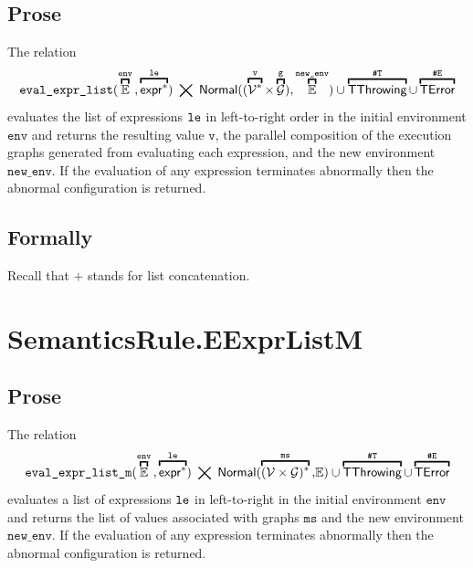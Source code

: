 \documentclass{book}
\newcommand\eqname[0]{\stackrel{\mathsmaller{\mathsf{is}}}{=}}
\newcommand\eqdef[0]{:=}
\newcommand\overname[2]{\overbracket{#1}^{#2}}
\newcommand\xgraph[0]{\textsf{g}}
\newcommand\emptygraph[0]{{\emptyset}_\xgraph}
\newcommand\XGraphs[0]{\mathcal{G}}
\newcommand\vals[0]{\mathcal{V}}
\newcommand\evalarrow[0]{\stackrel{\mathsf{asl}}{\rightsquigarrow}}
\newcommand\aslrel[0]{\bigtimes}
\newcommand\aslsep[0]{\mathbf{,}}
\newcommand\sslash[0]{\mathbin{/\mkern-6mu/}}
\newcommand\terminateas[0]{\;\sslash\;}
\newcommand\ThrowingConfig[0]{\texttt{\#T}}
\newcommand\ErrorConfig[0]{\texttt{\#E}}
\newcommand\OrAbnormal[0]{\terminateas \ThrowingConfig, \ErrorConfig}
\newcommand\TError[0]{\textsf{TError}}
\newcommand\TThrowing[0]{\textsf{TThrowing}}
\newcommand\evalexpr[1]{\texttt{eval\_expr}(#1)}
\newcommand\evalexprlist[1]{\texttt{eval\_expr\_list}(#1)}
\newcommand\evalexprlistm[1]{\texttt{eval\_expr\_list\_m}(#1)}
\newcommand\Normal[0]{\textsf{Normal}}
\newcommand\newenv[0]{\texttt{new\_env}}
\newcommand\env[0]{\texttt{env}}
\newcommand\envone[0]{\texttt{env1}}
\newcommand\vg[0]{\texttt{g}}
\newcommand\vv[0]{\texttt{v}}
\newcommand\vvs[0]{\texttt{vs}}
\newcommand\vms[0]{\texttt{ms}}
\newcommand\vvone[0]{\texttt{v1}}
\newcommand\vgone[0]{\texttt{g1}}
\newcommand\vgtwo[0]{\texttt{g2}}
\begin{document}
\subsection{Prose}
The relation
\[
  \evalexprlist{\overname{\envs}{\env} \aslsep \overname{\expr^*}{\vle}} \;\aslrel\;
  \Normal((\overname{\vals^*}{\vv} \times \overname{\XGraphs}{\vg})\aslsep \overname{\envs}{\newenv}) \cup
  \overname{\TThrowing}{\ThrowingConfig} \cup \overname{\TError}{\ErrorConfig}
\]
evaluates the list of expressions $\texttt{le}$ in left-to-right order in the initial environment $\env$
and returns the resulting value $\vv$, the parallel composition of the execution graphs
generated from evaluating each expression, and the new environment $\newenv$.
If the evaluation of any expression terminates abnormally then the abnormal configuration is returned.

\begin{emptyformal}
\subsection{Formally}
Recall that $+$ stands for list concatenation.
\end{emptyformal}

\section{SemanticsRule.EExprListM \label{sec:SemanticsRule.EExprListM}}
\subsection{Prose}
The relation
\[
  \evalexprlistm{\overname{\envs}{\env} \aslsep \overname{\expr^*}{\vle}} \;\aslrel\;
          \Normal(\overname{(\vals\times\XGraphs)^* }{\vms} \aslsep \envs) \cup
          \overname{\TThrowing}{\ThrowingConfig} \cup \overname{\TError}{\ErrorConfig}
\]
evaluates a list of expressions $\texttt{le}$ in left-to-right in the initial environment $\env$
and returns the list of values associated with graphs $\vms$ and the new environment $\newenv$.
If the evaluation of any expression terminates abnormally then the abnormal configuration is returned.
\end{document}
